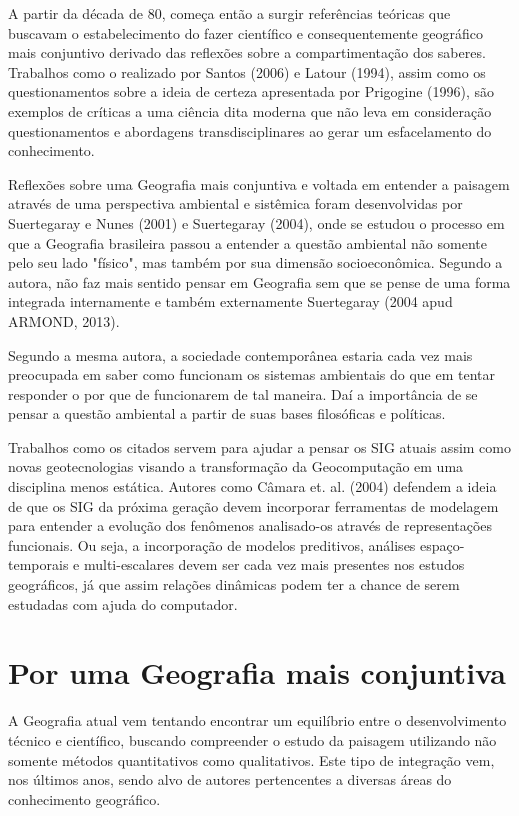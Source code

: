 A partir da década de 80, começa então a surgir referências teóricas que buscavam o estabelecimento do fazer científico e consequentemente geográfico mais conjuntivo derivado das reflexões sobre a compartimentação dos saberes. Trabalhos como o realizado por Santos (2006) e Latour (1994), assim como os questionamentos sobre a ideia de certeza apresentada por Prigogine (1996), são exemplos de críticas a uma ciência dita moderna que não leva em consideração questionamentos e abordagens transdisciplinares ao gerar um esfacelamento do conhecimento.

Reflexões sobre uma Geografia mais conjuntiva e voltada em entender a paisagem através de uma perspectiva ambiental e sistêmica foram desenvolvidas por Suertegaray e Nunes (2001) e Suertegaray (2004), onde se estudou o processo em que a Geografia brasileira passou a entender a questão ambiental não somente pelo seu lado "físico", mas também por sua dimensão socioeconômica. Segundo a autora, não faz mais sentido pensar em Geografia sem que se pense de uma forma integrada internamente e também externamente Suertegaray (2004 apud ARMOND, 2013). 

Segundo a mesma autora, a sociedade contemporânea estaria cada vez mais preocupada em saber como funcionam os sistemas ambientais do que em tentar responder o por que de funcionarem de tal maneira. Daí a importância de se pensar a questão ambiental a partir de suas bases filosóficas e políticas. 

Trabalhos como os citados servem para ajudar a pensar os SIG atuais assim como novas geotecnologias visando a transformação da Geocomputação em uma disciplina menos estática. Autores como Câmara et. al. (2004) defendem a ideia de que os SIG da próxima geração devem incorporar ferramentas de modelagem para entender a evolução dos fenômenos analisado-os através de representações funcionais. Ou seja, a incorporação de modelos preditivos, análises espaço-temporais e multi-escalares devem ser cada vez mais presentes nos estudos geográficos, já que assim relações dinâmicas podem ter a chance de serem estudadas com ajuda do computador.

 
\section{Por uma Geografia mais conjuntiva}

A Geografia atual vem tentando encontrar um equilíbrio entre o desenvolvimento técnico e científico, buscando compreender o estudo da paisagem utilizando não somente métodos quantitativos como qualitativos. Este tipo de integração vem, nos últimos anos, sendo alvo de autores pertencentes a diversas áreas do conhecimento geográfico.

